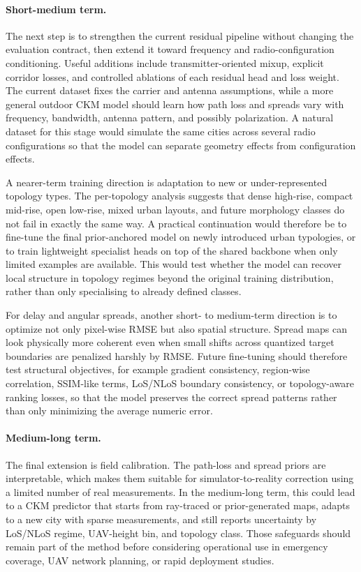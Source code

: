 \paragraph{Short-medium term.}
The next step is to strengthen the current residual pipeline without changing
the evaluation contract, then extend it toward frequency and radio-configuration
conditioning. Useful additions include transmitter-oriented mixup, explicit
corridor losses, and controlled ablations of each residual head and loss
weight. The current
dataset fixes the carrier and antenna assumptions, while a more general outdoor
CKM model should learn how path loss and spreads vary with frequency,
bandwidth, antenna pattern, and possibly polarization. A natural dataset for
this stage would simulate the same cities across several radio configurations
so that the model can separate geometry effects from configuration effects.

A nearer-term training direction is adaptation to new or under-represented
topology types. The per-topology analysis suggests that dense high-rise,
compact mid-rise, open low-rise, mixed urban layouts, and future morphology
classes do not fail in exactly the same way. A practical continuation would
therefore be to fine-tune the final prior-anchored model on newly introduced
urban typologies, or to train lightweight specialist heads on top of the shared
backbone when only limited examples are available. This would test whether the
model can recover local structure in topology regimes beyond the original
training distribution, rather than only specialising to already defined classes.

For delay and angular spreads, another short- to medium-term direction is to
optimize not only pixel-wise RMSE but also spatial structure. Spread maps can
look physically more coherent even when small shifts across quantized target
boundaries are penalized harshly by RMSE. Future fine-tuning should therefore
test structural objectives, for example gradient consistency, region-wise
correlation, SSIM-like terms, LoS/NLoS boundary consistency, or topology-aware
ranking losses, so that the model preserves the correct spread patterns rather
than only minimizing the average numeric error.

\paragraph{Medium-long term.}
The final extension is field calibration. The path-loss and spread priors are
interpretable, which makes them suitable for simulator-to-reality correction
using a limited number of real measurements. In the medium-long term, this could lead
to a CKM predictor that starts from ray-traced or prior-generated maps, adapts
to a new city with sparse measurements, and still reports uncertainty by
LoS/NLoS regime, UAV-height bin, and topology class. Those safeguards should
remain part of the method before considering operational use in emergency
coverage, UAV network planning, or rapid deployment studies.
